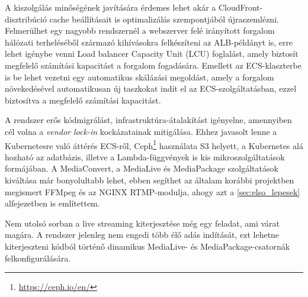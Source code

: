 A kiszolgálás minőségének javítására érdemes lehet akár a CloudFront-disztribúció cache beállításait is optimalizálás szempontjából újraszemlézni. Felmerülhet egy nagyobb rendszernél a webszerver felé irányított forgalom hálózati terheléséből származó kihívásokra felkészíteni az ALB-példányt is, erre lehet igénybe venni Load balancer Capacity Unit (LCU) foglalást, amely biztosít megfelelő számítási kapacitást a forgalom fogadására. Emellett az ECS-klaszterbe is be lehet vezetni egy automatikus skálázási megoldást, amely a forgalom növekedésével automatikusan új taszkokat indít el az ECS-szolgáltatásban, ezzel biztosítva a megfelelő számítási kapacitást.

A rendszer erős kódmigrálást, infrastruktúra-átalakítást igényelne, amennyiben cél volna a \emph{vendor lock-in}\cite{lockIn} kockázatainak mitigálása. Ehhez javasolt lenne a Kubernetesre való áttérés ECS-ről\cite{k8s}, Ceph\footnote{\url{https://ceph.io/en/}} használata S3 helyett, a Kubernetes alá hozható az adatbázis, illetve a Lambda-függvények is kis mikroszolgáltatások formájában. A MediaConvert, a MediaLive és MediaPackage szolgáltatások kiváltása már bonyolultabb lehet, ebben segíthet az általam korábbi projektben megismert FFMpeg és az NGINX RTMP-modulja\cite{rtmpNginx}, ahogy azt a \ref{sec:elso_lepesek} alfejezetben is említettem.

Nem utolsó sorban a live streaming kiterjesztése még egy feladat, ami várat magára. A rendszer jelenleg nem engedi több élő adás indítását, ezt lehetne kiterjeszteni kódból történő dinamikus MediaLive- és MediaPackage-csatornák felkonfigurálására.
